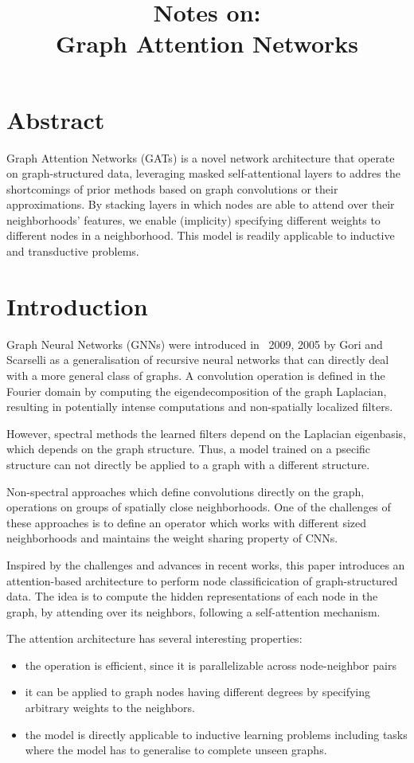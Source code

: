 \documentclass{article}
\title{\textbf{Notes on:}\\ Graph Attention Networks}
\author{}
\begin{document}
\maketitle{}

\section{Abstract}
Graph Attention Networks (GATs) is a novel network architecture that operate on
graph-structured data, leveraging masked self-attentional layers to addres the
shortcomings of prior methods based on graph convolutions or their
approximations. By stacking layers in which nodes are able to attend over their
neighborhoods' features, we enable (implicity) specifying different weights to
different nodes in a neighborhood. This model is readily applicable to
inductive and transductive problems.

\section{Introduction}
Graph Neural Networks (GNNs) were introduced in ~2009, 2005 by Gori and
Scarselli as a generalisation of recursive neural networks that can directly
deal with a more general class of graphs. A convolution operation is defined in
the Fourier domain by computing the eigendecomposition of the graph Laplacian,
resulting in potentially intense computations and non-spatially localized
filters.

However, spectral methods the learned filters depend on  the Laplacian
eigenbasis, which depends on the graph structure. Thus, a model trained on a
psecific structure can not directly be applied to a graph with a different
structure.

Non-spectral approaches which define convolutions directly on the graph,
operations on groups of spatially close neighborhoods. One of the challenges of
these approaches is to define an operator which works with different sized
neighborhoods and maintains the weight sharing property of CNNs.

Inspired by the challenges and advances in recent works, this paper introduces
an attention-based architecture to perform node classificication of
graph-structured data. The idea is to compute the hidden representations of
each node in the graph, by attending over its neighbors, following a
self-attention mechanism.

The attention architecture has several interesting properties:
\begin{itemize}
  \item the operation is efficient, since it is parallelizable across
    node-neighbor pairs
  \item it can be applied to graph nodes having different degrees by specifying
    arbitrary weights to the neighbors.
  \item the model is directly applicable to inductive learning problems
    including tasks where the model has to generalise to complete unseen
    graphs.
\end{itemize}
\end{document}
